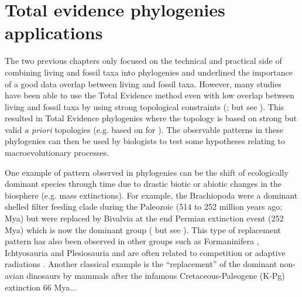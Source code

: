 \section{Total evidence phylogenies applications}
The two previous chapters only focused on the technical and practical side of combining living and fossil taxa into phylogenies and underlined the importance of a good data overlap between living and fossil taxa.
However, many studies have been able to use the Total Evidence method even with low overlap between living and fossil taxa by using strong topological constraints (\citealt{ronquista2012,schragocombining2013,slaterphylogenetic2013,beckancient2014}; but see \citealt{Arcila2015131,Dembo2015}).
This resulted in Total Evidence phylogenies where the topology is based on strong but valid \textit{a priori} topologies (e.g. based on \citealt{meredithimpacts2011} for \citealt{slaterphylogenetic2013}).
The observable patterns in these phylogenies can then be used by biologists to test some hypotheses relating to macroevolutionary processes.

One example of pattern observed in phylogenies can be the shift of ecologically dominant species through time due to drastic biotic or abiotic changes in the biosphere (e.g. mass extinctions).
For example, the Brachiopoda were a dominant shelled filter feeding clade during the Paleozoic (514 to 252 million years ago; Mya) but were replaced by Bivalvia at the end Permian extinction event (252 Mya) which is now the dominant group (\citealt{Sepkiski1981,CLAPHAM01102006} but see \citealt{Payne22052014}).
This type of replacement pattern has also been observed in other groups such as Formaninifera \citep{Coxall01042006}, Ichtyosauria \citep{thorneresetting2011} and Plesiosauria \citealt{bensonfaunal2014} and are often related to competition \citep{brusatte50} or adaptive radiations \citep{Losos2010}.
Another classical example is the ``replacement'' of the dominant non-avian dinosaurs by mammals after the infamous Cretaceous-Paleogene (K-Pg) extinction 66 Mya...

